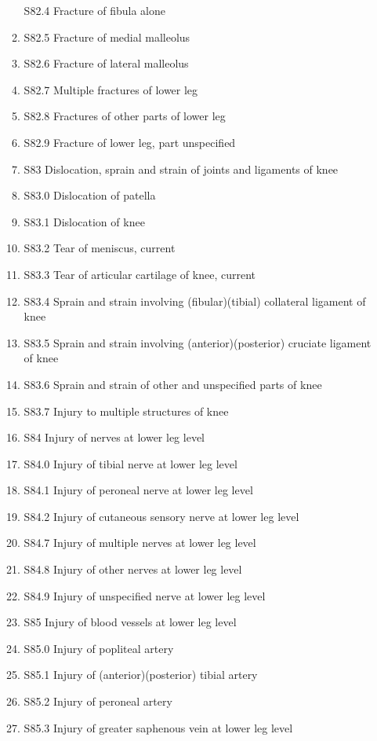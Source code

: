 \documentclass[
]{scrartcl}
\begin{document}
\begin{itemize}
\begin{enumerate}
    S82.4 Fracture of fibula alone
  \item
    S82.5 Fracture of medial malleolus
  \item
    S82.6 Fracture of lateral malleolus
  \item
    S82.7 Multiple fractures of lower leg
  \item
    S82.8 Fractures of other parts of lower leg
  \item
    S82.9 Fracture of lower leg, part unspecified
  \item
    S83 Dislocation, sprain and strain of joints and ligaments of knee
  \item
    S83.0 Dislocation of patella
  \item
    S83.1 Dislocation of knee
  \item
    S83.2 Tear of meniscus, current
  \item
    S83.3 Tear of articular cartilage of knee, current
  \item
    S83.4 Sprain and strain involving (fibular)(tibial) collateral
    ligament of knee
  \item
    S83.5 Sprain and strain involving (anterior)(posterior) cruciate
    ligament of knee
  \item
    S83.6 Sprain and strain of other and unspecified parts of knee
  \item
    S83.7 Injury to multiple structures of knee
  \item
    S84 Injury of nerves at lower leg level
  \item
    S84.0 Injury of tibial nerve at lower leg level
  \item
    S84.1 Injury of peroneal nerve at lower leg level
  \item
    S84.2 Injury of cutaneous sensory nerve at lower leg level
  \item
    S84.7 Injury of multiple nerves at lower leg level
  \item
    S84.8 Injury of other nerves at lower leg level
  \item
    S84.9 Injury of unspecified nerve at lower leg level
  \item
    S85 Injury of blood vessels at lower leg level
  \item
    S85.0 Injury of popliteal artery
  \item
    S85.1 Injury of (anterior)(posterior) tibial artery
  \item
    S85.2 Injury of peroneal artery
  \item
    S85.3 Injury of greater saphenous vein at lower leg level

\end{enumerate}
\end{itemize}
\end{document}
